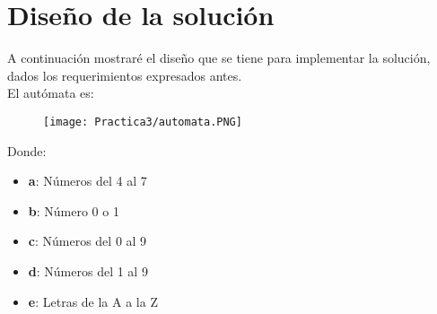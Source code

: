 \documentclass[12pt]{article}
\begin{document}

	\section{Diseño de la solución}

	A continuación mostraré el diseño que se tiene para implementar la solución, dados
	los requerimientos expresados antes. \\
	El autómata es:

	\begin{figure}[H]
	        \centering
	        \texttt{[image: Practica3/automata.PNG]}
	\end{figure}

	Donde:
	\begin{itemize}
		\item \textbf{a}: Números del 4 al 7
		\item \textbf{b}: Número 0 o 1
		\item \textbf{c}: Números del 0 al 9
		\item \textbf{d}: Números del 1 al 9
		\item \textbf{e}: Letras de la A a la Z
	\end{itemize}
\end{document}
